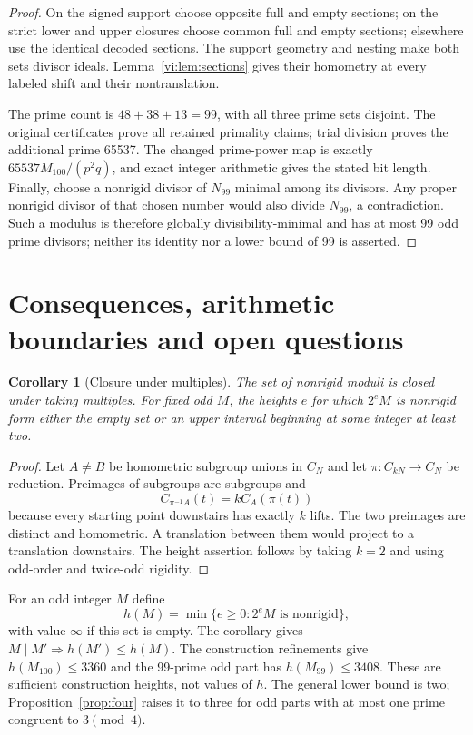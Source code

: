\documentclass[11pt]{article}
\numberwithin{equation}{section}
\newtheorem{corollary}[theorem]{Corollary}
\theoremstyle{definition}
\theoremstyle{remark}
\begin{document}
\begin{proof}
On the signed support choose opposite full and empty sections; on the strict lower and upper closures choose common full and empty sections; elsewhere use the identical decoded sections. The support geometry and nesting make both sets divisor ideals. Lemma~\ref{vi:lem:sections} gives their homometry at every labeled shift and their nontranslation.

The prime count is $48+38+13=99$, with all three prime sets disjoint. The original certificates prove all retained primality claims; trial division proves the additional prime 65537. The changed prime-power map is exactly $65537M_{100}/(p^2q)$, and exact integer arithmetic gives the stated bit length. Finally, choose a nonrigid divisor of $N_{99}$ minimal among its divisors. Any proper nonrigid divisor of that chosen number would also divide $N_{99}$, a contradiction. Such a modulus is therefore globally divisibility-minimal and has at most 99 odd prime divisors; neither its identity nor a lower bound of 99 is asserted.
\end{proof}



\section{Consequences, arithmetic boundaries and open questions}\label{v2:sec:consequences}

\begin{corollary}[Closure under multiples]\label{vi:cor:lift}
The set of nonrigid moduli is closed under taking multiples. For fixed odd $M$, the heights $e$ for which $2^eM$ is nonrigid form either the empty set or an upper interval beginning at some integer at least two.
\end{corollary}
\begin{proof}
Let $A\ne B$ be homometric subgroup unions in $C_N$ and let $\pi:C_{kN}\to C_N$ be reduction. Preimages of subgroups are subgroups and
\[
 C_{\pi^{-1}A}(t)=kC_A(\pi(t))
\]
because every starting point downstairs has exactly $k$ lifts. The two preimages are distinct and homometric. A translation between them would project to a translation downstairs. The height assertion follows by taking $k=2$ and using odd-order and twice-odd rigidity.
\end{proof}

For an odd integer $M$ define
\[
 h(M)=\min\{e\ge0:2^eM\text{ is nonrigid}\},
\]
with value $\infty$ if this set is empty. The corollary gives $M\mid M'\Rightarrow h(M')\le h(M)$. The construction refinements give $h(M_{100})\le3360$ and the 99-prime odd part has $h(M_{99})\le3408$. These are sufficient construction heights, not values of $h$. The general lower bound is two; Proposition~\ref{prop:four} raises it to three for odd parts with at most one prime congruent to $3\pmod4$.
\end{document}
